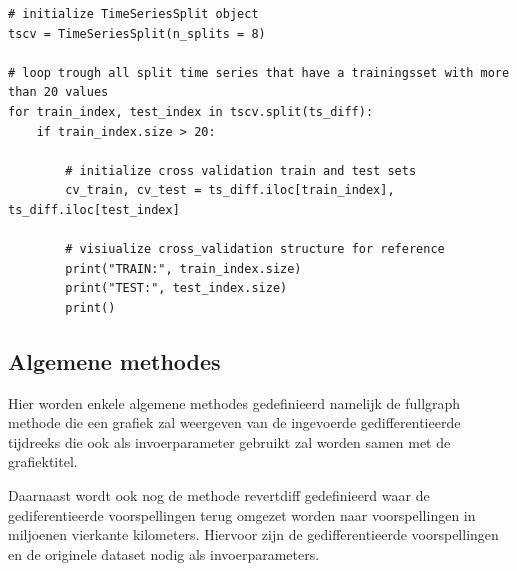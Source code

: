 \begin{verbatim}
# initialize TimeSeriesSplit object
tscv = TimeSeriesSplit(n_splits = 8)

# loop trough all split time series that have a trainingsset with more than 20 values
for train_index, test_index in tscv.split(ts_diff):
    if train_index.size > 20:

        # initialize cross validation train and test sets
        cv_train, cv_test = ts_diff.iloc[train_index], ts_diff.iloc[test_index]
        
        # visiualize cross_validation structure for reference
        print("TRAIN:", train_index.size)
        print("TEST:", test_index.size)
        print()
\end{verbatim}

\subsection{Algemene methodes}

Hier worden enkele algemene methodes gedefinieerd namelijk de full\textunderscore graph methode die een grafiek zal weergeven van de ingevoerde gedifferentieerde tijdreeks die ook als invoerparameter gebruikt zal worden samen met de grafiektitel.

Daarnaast wordt ook nog de methode revert\textunderscore diff gedefinieerd waar de gediferentieerde voorspellingen terug omgezet worden naar voorspellingen in miljoenen vierkante kilometers. Hiervoor zijn de gedifferentieerde voorspellingen en de originele dataset nodig als invoerparameters.


